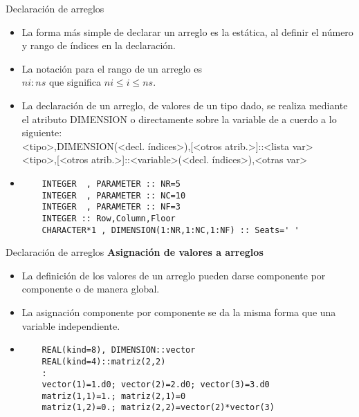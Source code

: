 \begin{frame}[fragile]{Declaración de arreglos}
 \begin{itemize}[<+(0)->]
 \item La forma más simple de declarar un arreglo es la estática, al definir el número y rango de índices en la declaración.
 \item La notación para el rango de un arreglo es\\ 
  \centering $ni:ns$ que significa $ni \leq i \leq ns$.
 \item La declaración de un arreglo, de valores de un tipo dado, se realiza mediante el atributo DIMENSION o directamente sobre la variable de a cuerdo a lo siguiente: \\ 
 \vspace{0.1cm}
  <tipo>,DIMENSION(<decl. índices>),[<otros atrib.>]::<lista var> \\ 
  <tipo>,[<otros atrib.>]::<variable>(<decl. índices>),<otras var>    
 \vspace{0.2cm}
  \item []
  \begin{verbatim}
    INTEGER  , PARAMETER :: NR=5
    INTEGER  , PARAMETER :: NC=10
    INTEGER  , PARAMETER :: NF=3
    INTEGER :: Row,Column,Floor
    CHARACTER*1 , DIMENSION(1:NR,1:NC,1:NF) :: Seats=' '
  \end{verbatim}        
 \end{itemize}
\end{frame} 


\begin{frame}[fragile]{Declaración de arreglos}
\textbf{Asignación de valores a arreglos}
 \begin{itemize}[<+(1)->]
 \item La definición de los valores de un arreglo pueden darse componente por componente o de manera global.
 \item La asignación componente por componente se da la misma forma que una variable independiente.
 \vspace{0.2cm}
 \item[]
   \begin{verbatim}
    REAL(kind=8), DIMENSION::vector
    REAL(kind=4)::matriz(2,2)
    :
    vector(1)=1.d0; vector(2)=2.d0; vector(3)=3.d0
    matriz(1,1)=1.; matriz(2,1)=0
    matriz(1,2)=0.; matriz(2,2)=vector(2)*vector(3)
   \end{verbatim}
 \end{itemize}
\end{frame} 


